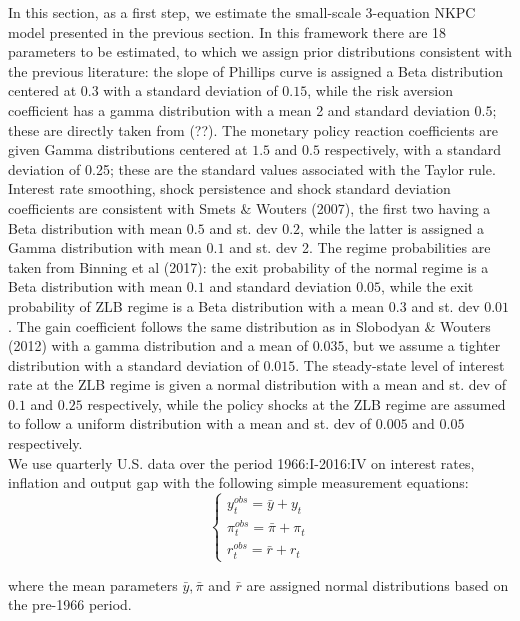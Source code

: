 \documentclass[12pt,reqno]{article}
\numberwithin{equation}{section}
\begin{document}
In this section, as a first step, we estimate the small-scale 3-equation NKPC model presented in the previous section. In this framework there are 18 parameters to be estimated, to which we assign prior distributions consistent with the previous literature: the slope of Phillips curve is assigned a Beta distribution centered at $0.3$ with a standard deviation of $0.15$, while the risk aversion coefficient has a gamma distribution with a mean 2 and standard deviation $0.5$; these are directly taken from (??). The monetary policy reaction coefficients are given Gamma distributions centered at $1.5$ and $0.5$ respectively, with a standard deviation of 0.25; these are the standard values associated with the Taylor rule. Interest rate smoothing, shock persistence and shock standard deviation coefficients are consistent with Smets \& Wouters (2007), the first two having a Beta distribution with mean $0.5 $ and st. dev $0.2$, while the latter is assigned a Gamma distribution with mean $0.1$ and st. dev 2. The regime probabilities are taken from Binning et al (2017): the exit probability of the normal regime is a Beta distribution with mean $0.1$ and standard deviation $0.05$, while the exit probability of ZLB regime is a Beta distribution with a mean $0.3$ and st. dev $0.01$. The gain coefficient follows the same distribution as in Slobodyan \& Wouters (2012) with a gamma distribution and a mean of $0.035$, but we assume a tighter distribution with a standard deviation of $0.015$. The steady-state level of interest rate at the ZLB regime is given a normal distribution with a mean and st. dev of $0.1$ and $0.25$ respectively, while the policy shocks at the ZLB regime are assumed to follow a uniform distribution with a mean and st. dev of $0.005$ and $0.05$ respectively.\\
\noindent
We use quarterly U.S. data over the period 1966:I-2016:IV on interest rates, inflation and output gap with the following simple measurement equations: 
$$
\begin{cases}
y_t^{obs}=\bar{y}+y_t \\
\pi_t^{obs}= \bar{\pi} + \pi_t \\
r_t^{obs}=\bar{r}+r_t 
\end{cases}  
$$

where the mean parameters $\bar{y}, \bar{\pi} $ and $\bar{r}$ are assigned normal distributions based on the pre-1966 period. \\
\end{document}
